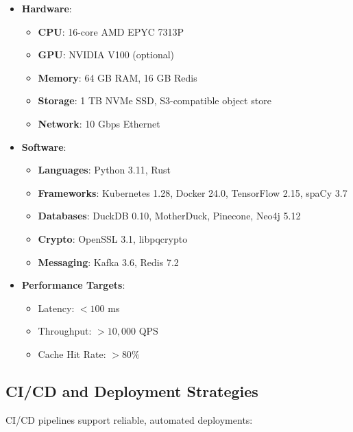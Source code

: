 \documentclass[11pt]{article}
\begin{document}
\begin{itemize}
    \item \textbf{Hardware}:
        \begin{itemize}
            \item \textbf{CPU}: 16-core AMD EPYC 7313P
            \item \textbf{GPU}: NVIDIA V100 (optional)
            \item \textbf{Memory}: 64 GB RAM, 16 GB Redis
            \item \textbf{Storage}: 1 TB NVMe SSD, S3-compatible object store
            \item \textbf{Network}: 10 Gbps Ethernet
        \end{itemize}

    \item \textbf{Software}:
        \begin{itemize}
            \item \textbf{Languages}: Python 3.11, Rust
            \item \textbf{Frameworks}: Kubernetes 1.28, Docker 24.0, TensorFlow 2.15, spaCy 3.7
            \item \textbf{Databases}: DuckDB 0.10, MotherDuck, Pinecone, Neo4j 5.12
            \item \textbf{Crypto}: OpenSSL 3.1, libpqcrypto
            \item \textbf{Messaging}: Kafka 3.6, Redis 7.2
        \end{itemize}

    \item \textbf{Performance Targets}:
        \begin{itemize}
            \item Latency: $ <100 $ ms
            \item Throughput: $ >10{,}000 $ QPS
            \item Cache Hit Rate: $ >80\% $
        \end{itemize}
\end{itemize}

\subsection{CI/CD and Deployment Strategies}
\label{subsec:cicd_deployment}

CI/CD pipelines support reliable, automated deployments:
\end{document}
